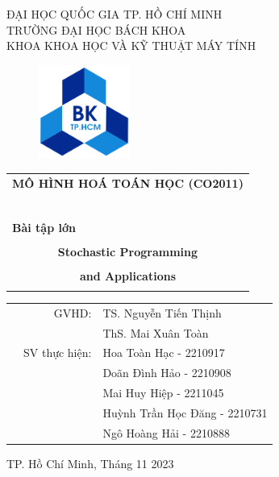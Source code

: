 \documentclass[a4paper]{article}
\begin{document}
\begin{titlepage}
\begin{center}
ĐẠI HỌC QUỐC GIA TP. HỒ CHÍ MINH \\
TRƯỜNG ĐẠI HỌC BÁCH KHOA \\
KHOA KHOA HỌC VÀ KỸ THUẬT MÁY TÍNH
\end{center}

\vspace{1cm}

\begin{figure}[h!]
\begin{center}
\includegraphics[width=3cm]{hcmut.png}
\end{center}
\end{figure}

\vspace{1cm}


\begin{center}
\begin{tabular}{c}
\multicolumn{1}{l}{\textbf{{\Large MÔ HÌNH HOÁ TOÁN HỌC (CO2011)}}}\\
~~\\
\hline
\\
\multicolumn{1}{l}{\textbf{{\Large Bài tập lớn}}}\\
\\
\textbf{{\Huge Stochastic Programming}}\\
\\
\textbf{{\Huge and Applications}}\\
\\
\hline
\end{tabular}
\end{center}

\vspace{3cm}

\begin{table}[h]
\begin{tabular}{rrl}
\hspace{5 cm} & GVHD: & TS. Nguyễn Tiến Thịnh\\
 &  & ThS. Mai Xuân Toàn\\
& SV thực hiện: & Hoa Toàn Hạc - 2210917 \\
& & Doãn Đình Hảo - 2210908 \\
& & Mai Huy Hiệp  - 2211045 \\
& & Huỳnh Trần Học Đăng - 2210731\\
& & Ngô Hoàng Hải - 2210888 
\end{tabular}
\end{table}

\begin{center}
{\footnotesize TP. Hồ Chí Minh, Tháng 11 2023}
\end{center}
\end{titlepage}
\end{document}
